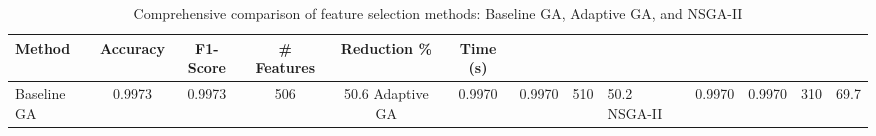 \begin{table}[htbp]
\centering
\caption{Comprehensive comparison of feature selection methods: Baseline GA, Adaptive GA, and NSGA-II}
\label{tab:table10}
\begin{tabular}{lccccc}
\toprule
Method & Accuracy & F1-Score & \# Features & Reduction \% & Time (s) \\
\midrule
Baseline GA & 0.9973 & 0.9973 & 506 & 50.6%
Adaptive GA & 0.9970 & 0.9970 & 510 & 50.2%
NSGA-II & 0.9970 & 0.9970 & 310 & 69.7%
\bottomrule
\end{tabular}
\end{table}